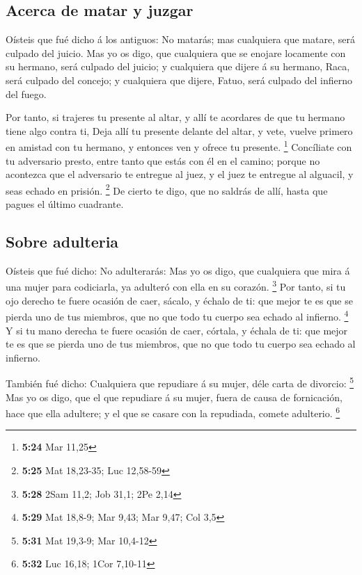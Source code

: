\hypertarget{acerca-de-matar-y-juzgar}{%
\subsection{Acerca de matar y juzgar}\label{acerca-de-matar-y-juzgar}}

 Oísteis que fué dicho á los antiguos: No matarás; mas
cualquiera que matare, será culpado del juicio.  Mas yo os
digo, que cualquiera que se enojare locamente con su hermano, será
culpado del juicio; y cualquiera que dijere á su hermano, Raca, será
culpado del concejo; y cualquiera que dijere, Fatuo, será culpado del
infierno del fuego.

 Por tanto, si trajeres tu presente al altar, y allí te
acordares de que tu hermano tiene algo contra ti,  Deja
allí tu presente delante del altar, y vete, vuelve primero en amistad
con tu hermano, y entonces ven y ofrece tu presente. \footnote{\textbf{5:24}
  Mar 11,25}  Concíliate con tu adversario presto, entre
tanto que estás con él en el camino; porque no acontezca que el
adversario te entregue al juez, y el juez te entregue al alguacil, y
seas echado en prisión. \footnote{\textbf{5:25} Mat 18,23-35; Luc
  12,58-59}  De cierto te digo, que no saldrás de allí,
hasta que pagues el último cuadrante.

\hypertarget{sobre-adulteria}{%
\subsection{Sobre adulteria}\label{sobre-adulteria}}

 Oísteis que fué dicho: No adulterarás:  Mas
yo os digo, que cualquiera que mira á una mujer para codiciarla, ya
adulteró con ella en su corazón. \footnote{\textbf{5:28} 2Sam 11,2; Job
  31,1; 2Pe 2,14}  Por tanto, si tu ojo derecho te fuere
ocasión de caer, sácalo, y échalo de ti: que mejor te es que se pierda
uno de tus miembros, que no que todo tu cuerpo sea echado al infierno.
\footnote{\textbf{5:29} Mat 18,8-9; Mar 9,43; Mar 9,47; Col 3,5}
 Y si tu mano derecha te fuere ocasión de caer, córtala, y
échala de ti: que mejor te es que se pierda uno de tus miembros, que no
que todo tu cuerpo sea echado al infierno.

 También fué dicho: Cualquiera que repudiare á su mujer,
déle carta de divorcio: \footnote{\textbf{5:31} Mat 19,3-9; Mar 10,4-12}
 Mas yo os digo, que el que repudiare á su mujer, fuera de
causa de fornicación, hace que ella adultere; y el que se casare con la
repudiada, comete adulterio. \footnote{\textbf{5:32} Luc 16,18; 1Cor
  7,10-11}

